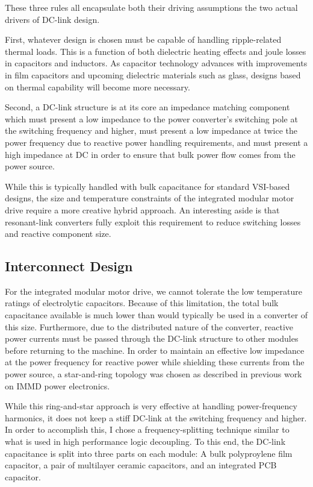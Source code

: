 These three rules all encapsulate both their driving assumptions the two
actual drivers of DC-link design.

First, whatever design is chosen must be capable of handling ripple-related
thermal loads.
This is a function of both dielectric heating effects and joule
losses in capacitors and inductors.
As capacitor technology advances with
improvements in film capacitors and upcoming dielectric materials such as
glass, designs based on thermal capability will become more necessary.

Second, a DC-link structure is at its core an impedance matching component
which must present a low impedance to the power converter's switching pole
at the switching frequency and higher, must present a low impedance at twice
the power frequency due to reactive power handling requirements, and must
present a high impedance at DC in order to ensure that bulk power flow comes
from the power source.

While this is typically handled with bulk capacitance for standard VSI-based
designs, the size and temperature constraints of the integrated modular motor
drive require a more creative hybrid approach.
An interesting aside is that resonant-link converters fully exploit this
requirement to reduce switching losses and reactive component size.

\subsection{Interconnect Design}
For the integrated modular motor drive, we cannot tolerate the low temperature
ratings of electrolytic capacitors.
Because of this limitation, the total bulk capacitance available is much lower
than would typically be used in a converter of this size.
Furthermore, due to the distributed nature of the converter, reactive power
currents must be passed through the DC-link structure to other modules before
returning to the machine.
In order to maintain an effective low impedance at the power frequency for
reactive power while shielding these currents from the power source, a
star-and-ring topology was chosen as described in previous work on IMMD power
electronics.

While this ring-and-star approach is very effective at handling
power-frequency harmonics, it does not keep a stiff DC-link at the switching
frequency and higher.
In order to accomplish this, I chose a frequency-splitting technique similar
to what is used in high performance logic decoupling.
To this end, the DC-link capacitance is split into three parts on each module:
A bulk polyproylene film capacitor, a pair of multilayer ceramic capacitors,
and an integrated PCB capacitor.


